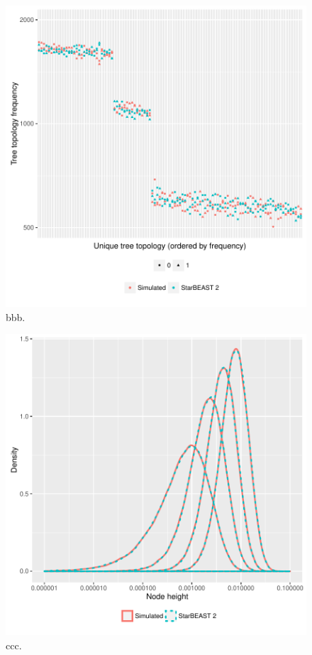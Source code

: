 \documentclass[12pt]{article}
\begin{document}
\clearpage

\begin{figure}[htb!]
\centering
\includegraphics[width=16cm]{gene_topology_frequencies.pdf}
\caption
{bbb.}
\label{fig:geneTopologyFrequencies}
\end{figure}

\clearpage

\begin{figure}[htb!]
\centering
\includegraphics[width=16cm]{species_node_heights.pdf}
\caption
{ccc.}
\label{fig:speciesNodeHeights}
\end{figure}
\end{document}
